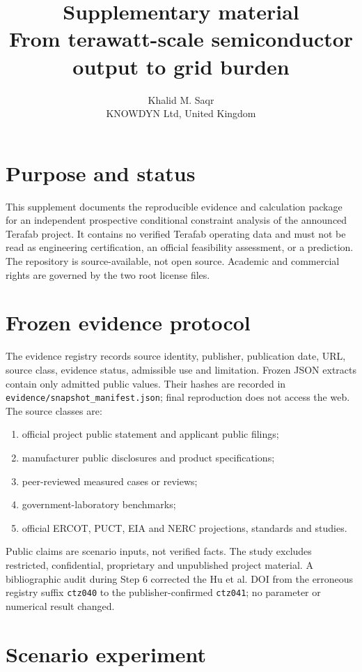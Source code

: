 \documentclass[11pt]{article}
\title{Supplementary material\\
From terawatt-scale semiconductor output to grid burden}
\author{Khalid M. Saqr\\\small KNOWDYN Ltd, United Kingdom}
\date{}
\begin{document}
\maketitle

\section{Purpose and status}

This supplement documents the reproducible evidence and calculation package
for an independent prospective conditional constraint analysis of the announced
Terafab project. It contains no verified Terafab operating data and must not be
read as engineering certification, an official feasibility assessment, or a
prediction. The repository is source-available, not open source. Academic and
commercial rights are governed by the two root license files.

\section{Frozen evidence protocol}

The evidence registry records source identity, publisher, publication date,
URL, source class, evidence status, admissible use and limitation. Frozen JSON
extracts contain only admitted public values. Their hashes are recorded in
\texttt{evidence/snapshot\_manifest.json}; final reproduction does not access
the web. The source classes are:

\begin{enumerate}
\item official project public statement and applicant public filings;
\item manufacturer public disclosures and product specifications;
\item peer-reviewed measured cases or reviews;
\item government-laboratory benchmarks;
\item official ERCOT, PUCT, EIA and NERC projections, standards and studies.
\end{enumerate}

Public claims are scenario inputs, not verified facts. The study excludes
restricted, confidential, proprietary and unpublished project material. A
bibliographic audit during Step 6 corrected the Hu et al. DOI from the erroneous
registry suffix \texttt{ctz040} to the publisher-confirmed \texttt{ctz041}; no
parameter or numerical result changed.

\section{Scenario experiment}
\end{document}

